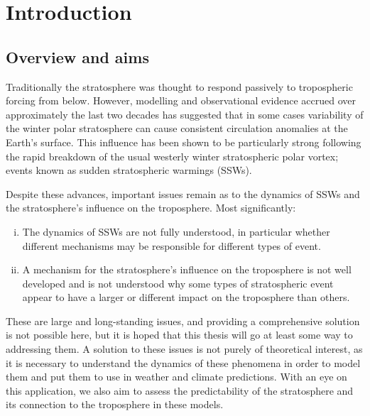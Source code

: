\chapter{Introduction}
\label{cha:intro}

\section{Overview and aims}


Traditionally the stratosphere was thought to respond passively to tropospheric
forcing from below. However, modelling and observational evidence accrued over
approximately the last two decades has suggested that in some cases variability
of the winter polar stratosphere can cause consistent circulation anomalies at
the Earth's surface. This influence has been shown to be particularly strong
following the rapid breakdown of the usual westerly winter stratospheric polar
vortex; events known as sudden stratospheric warmings (SSWs). 

Despite these advances, important issues remain as to the dynamics of SSWs
and the stratosphere's influence on the troposphere. Most significantly:
\begin{enumerate}[i.]
\item The dynamics of SSWs are not fully understood, in particular whether
  different mechanisms may be responsible for different types of event.
\item A mechanism for the stratosphere's influence on the troposphere is not
  well developed and is not understood why some types of stratospheric event
  appear to have a larger or different impact on the troposphere than others.
\end{enumerate}
These are large and long-standing issues, and providing a comprehensive solution
is not possible here, but it is hoped that this thesis will go at least some way
to addressing them. A solution to these issues is not purely of theoretical
interest, as it is necessary to understand the dynamics of these phenomena in
order to model them and put them to use in weather and climate predictions. With
an eye on this application, we also aim to assess the predictability of the
stratosphere and its connection to the troposphere in these models.

